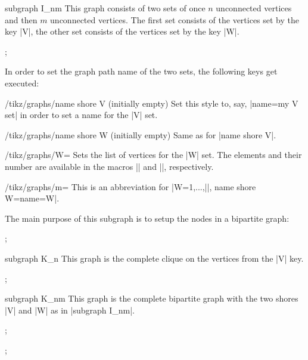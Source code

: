 \begin{graph}{subgraph I\_nm}
  This graph consists of two sets of once $n$ unconnected vertices and
  then $m$ unconnected vertices. The first set consists of the
  vertices set by the key |V|, the other set consists of the vertices
  set by the key |W|.
\begin{codeexample}[]
\tikz {};    
\end{codeexample}
  In order to set the graph path name of the two
  sets, the following keys get executed:
  \begin{stylekey}{/tikz/graphs/name shore V (initially \normalfont empty)}
    Set this style to, say, |name=my V set| in order to set a
    name for the |V| set.    
  \end{stylekey}
  \begin{stylekey}{/tikz/graphs/name shore W (initially \normalfont empty)}
    Same as for |name shore V|.
  \end{stylekey}
  \begin{key}{/tikz/graphs/W=}
    Sets the list of vertices for the |W| set. The elements and
    their number are available in the macros |\tikzgraphW| and
    |\tikzgraphWnum|, respectively.
  \end{key}
  \begin{key}{/tikz/graphs/m=}
    This is an abbreviation for
    |W={1,...,||}, name shore W={name=W}|.
  \end{key}
  The main purpose of this subgraph is to setup the nodes in a
  bipartite graph:
\begin{codeexample}[]
\tikz {};    
\end{codeexample}
\end{graph}

\begin{graph}{subgraph K\_n}
  This graph is the complete clique on the vertices from the |V| key. 
\begin{codeexample}[]
\tikz {};    
\end{codeexample}
\end{graph}


\begin{graph}{subgraph K\_nm}
  This graph is the complete bipartite graph with the two shores |V|
  and |W| as in |subgraph I_nm|.
\begin{codeexample}[]
\tikz {};    
\end{codeexample}
\begin{codeexample}[]
\tikz {};    
\end{codeexample}
\end{graph}

